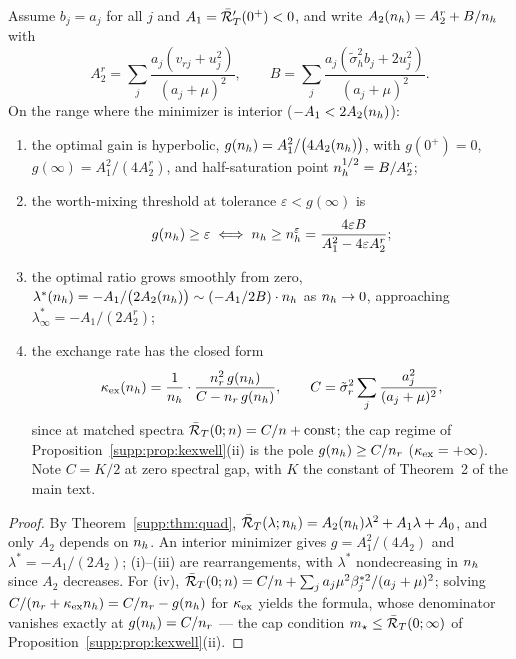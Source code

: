 \begin{theorem}\label{supp:thm:dosage}
Assume $b_j = a_j$ for all $j$ and $A_1 = \bar{\mathcal{R}}_T'(0^+) < 0$, and write $A_2(n_h) = A_2^r + B/n_h$ with
\begin{equation}
A_2^r = \sum_j \frac{a_j (v_{rj} + u_j^2)}{(a_j+\mu)^2},
\qquad
B = \sum_j \frac{a_j (\tilde\sigma_h^2 b_j + 2u_j^2)}{(a_j+\mu)^2}.
\end{equation}
On the range where the minimizer is interior ($-A_1 < 2A_2(n_h)$):
\begin{enumerate}
\item[(i)] the optimal gain is hyperbolic,
$g(n_h) = A_1^2 / \big(4A_2(n_h)\big)$, with $g(0^+) = 0$, $g(\infty) = A_1^2/(4A_2^r)$, and half-saturation point $n_h^{1/2} = B/A_2^r$;
\item[(ii)] the worth-mixing threshold at tolerance $\varepsilon < g(\infty)$ is
\begin{equation}
g(n_h) \ge \varepsilon \iff n_h \ge n_h^\varepsilon = \frac{4\varepsilon B}{A_1^2 - 4\varepsilon A_2^r};
\end{equation}
\item[(iii)] the optimal ratio grows smoothly from zero,
$\lambda^*(n_h) = -A_1/\big(2A_2(n_h)\big) \sim (-A_1/2B)\cdot n_h$ as $n_h \to 0$, approaching $\lambda^*_\infty = -A_1/(2A_2^r)$;
\item[(iv)] the exchange rate has the closed form
\begin{equation}
\kappa_{\mathrm{ex}}(n_h) = \frac{1}{n_h}\cdot \frac{n_r^2\, g(n_h)}{C - n_r\, g(n_h)},
\qquad
C = \tilde\sigma_r^2 \sum_j \frac{a_j^2}{(a_j+\mu)^2},
\end{equation}
since at matched spectra $\bar{\mathcal{R}}_T(0; n) = C/n + \mathrm{const}$; the cap regime of Proposition~\ref{supp:prop:kexwell}(ii) is the pole $g(n_h) \ge C/n_r$ ($\kappa_{\mathrm{ex}} = +\infty$).
Note $C = K/2$ at zero spectral gap, with $K$ the constant of Theorem~2 of the main text.
\end{enumerate}
\end{theorem}

\begin{proof}
By Theorem~\ref{supp:thm:quad}, $\bar{\mathcal{R}}_T(\lambda; n_h) = A_2(n_h)\lambda^2 + A_1\lambda + A_0$, and only $A_2$ depends on $n_h$.
An interior minimizer gives $g = A_1^2/(4A_2)$ and $\lambda^* = -A_1/(2A_2)$; (i)--(iii) are rearrangements, with $\lambda^*$ nondecreasing in $n_h$ since $A_2$ decreases.
For (iv), $\bar{\mathcal{R}}_T(0; n) = C/n + \sum_j a_j \mu^2\beta_j^{*2}/(a_j+\mu)^2$; solving $C/(n_r + \kappa_{\mathrm{ex}}n_h) = C/n_r - g(n_h)$ for $\kappa_{\mathrm{ex}}$ yields the formula, whose denominator vanishes exactly at $g(n_h) = C/n_r$ --- the cap condition $m_\star \le \bar{\mathcal{R}}_T(0;\infty)$ of Proposition~\ref{supp:prop:kexwell}(ii).
\end{proof}

